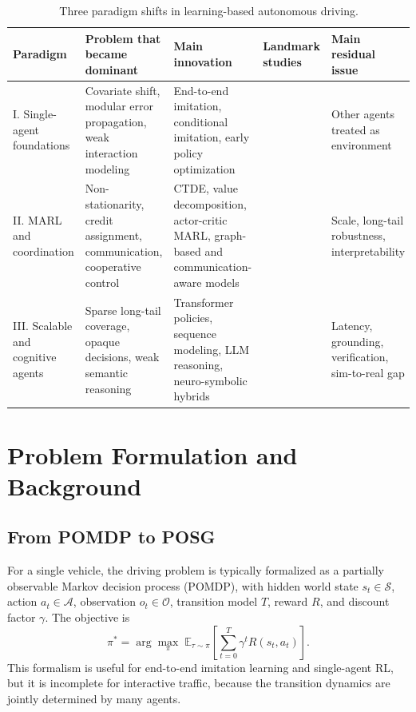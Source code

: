 \documentclass[12pt, a4paper]{article}
\begin{document}
\begin{table}[ht]
\centering
\caption{Three paradigm shifts in learning-based autonomous driving.
\label{tab:paradigm_shift}}
\renewcommand{\arraystretch}{1.2}
\small
\begin{tabular}{p{2.2cm}p{3.0cm}p{3.2cm}p{3.2cm}p{2.6cm}}
\toprule
\textbf{Paradigm} & \textbf{Problem that became dominant} & \textbf{Main innovation} & \textbf{Landmark studies} & \textbf{Main residual issue} \\
\midrule
I. Single-agent foundations & Covariate shift, modular error propagation, weak interaction modeling & End-to-end imitation, conditional imitation, early policy optimization & \cite{bojarski2016end,bansal2018chauffeur,codevilla2018end,schulman2017proximal} & Other agents treated as environment \\
\addlinespace
II. MARL and coordination & Non-stationarity, credit assignment, communication, cooperative control & CTDE, value decomposition, actor-critic MARL, graph-based and communication-aware models & \cite{lowe2017multi,rashid2018qmix,yu2021surprising,das2019tarmac,gao2020vectornet,wang2020v2vnet} & Scale, long-tail robustness, interpretability \\
\addlinespace
III. Scalable and cognitive agents & Sparse long-tail coverage, opaque decisions, weak semantic reasoning & Transformer policies, sequence modeling, LLM reasoning, neuro-symbolic hybrids & \cite{wen2022multi,fu2023drive,wen2023dilu,mao2023gpt,sha2023languagempc} & Latency, grounding, verification, sim-to-real gap \\
\bottomrule
\end{tabular}
\end{table}

\section{Problem Formulation and Background}
\label{sec:background}

\subsection{From POMDP to POSG}

For a single vehicle, the driving problem is typically formalized as a partially
observable Markov decision process (POMDP), with hidden world state
$s_t \in \mathcal{S}$, action $a_t \in \mathcal{A}$, observation
$o_t \in \mathcal{O}$, transition model $T$, reward $R$, and discount factor
$\gamma$. The objective is
\begin{equation}
\pi^* = \arg\max_{\pi} \; \mathbb{E}_{\tau \sim \pi}
\left[\sum_{t=0}^{T} \gamma^t R(s_t,a_t)\right].
\label{eq:pomdp}
\end{equation}
This formalism is useful for end-to-end imitation learning and single-agent RL,
but it is incomplete for interactive traffic, because the transition dynamics are
jointly determined by many agents.
\end{document}
